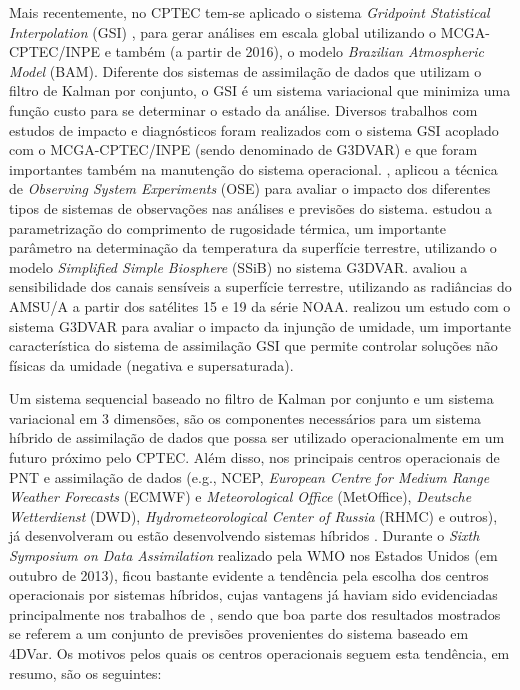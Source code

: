 Mais recentemente, no CPTEC tem-se aplicado o sistema \textit{Gridpoint Statistical Interpolation} (GSI) \cite{wuetal/2002,kleistetal/2009}, para gerar análises em escala global utilizando o MCGA-CPTEC/INPE e também (a partir de 2016), o modelo \textit{Brazilian Atmospheric Model} (BAM). Diferente dos sistemas de assimilação de dados que utilizam o filtro de Kalman por conjunto, o GSI é um sistema variacional que minimiza uma função custo para se determinar o estado da análise. Diversos trabalhos com estudos de impacto e diagnósticos foram realizados com o sistema GSI acoplado com o MCGA-CPTEC/INPE (sendo denominado de G3DVAR) e que foram importantes também na manutenção do sistema operacional. , aplicou a técnica de \textit{Observing System Experiments} (OSE) para avaliar o impacto dos diferentes tipos de sistemas de observações nas análises e previsões do sistema.  estudou a parametrização do comprimento de rugosidade térmica, um importante parâmetro na determinação da temperatura da superfície terrestre, utilizando o modelo \textit{Simplified Simple Biosphere} (SSiB) no sistema G3DVAR.  avaliou a sensibilidade dos canais sensíveis a superfície terrestre, utilizando as radiâncias do AMSU/A a partir dos satélites 15 e 19 da série NOAA.  realizou um estudo com o sistema G3DVAR para avaliar o impacto da injunção de umidade, um importante característica do sistema de assimilação GSI que permite controlar soluções não físicas da umidade (negativa e supersaturada).

Um sistema sequencial baseado no filtro de Kalman por conjunto e um sistema variacional em 3 dimensões, são os componentes necessários para um sistema híbrido de assimilação de dados que possa ser utilizado operacionalmente em um futuro próximo pelo CPTEC. Além disso, nos principais centros operacionais de PNT e assimilação de dados (e.g., NCEP, \textit{European Centre for Medium Range Weather Forecasts} (ECMWF) e \textit{Meteorological Office} (MetOffice), \textit{Deutsche Wetterdienst} (DWD), \textit{Hydrometeorological Center of Russia} (RHMC) e outros), já desenvolveram ou estão desenvolvendo sistemas híbridos \cite{wgne27/2011,wgne28/2012,wgne30/2015}. Durante o \textit{Sixth Symposium on Data Assimilation} realizado pela WMO nos Estados Unidos (em outubro de 2013), ficou bastante evidente a tendência pela escolha dos centros operacionais por sistemas híbridos, cujas vantagens já haviam sido evidenciadas principalmente nos trabalhos de , sendo que boa parte dos resultados mostrados se referem a um conjunto de previsões provenientes do sistema baseado em 4DVar. Os motivos pelos quais os centros operacionais seguem esta tendência, em resumo, são os seguintes:

